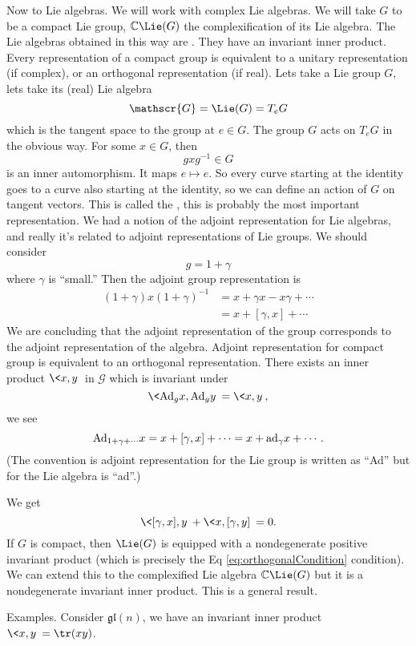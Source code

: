 Now to Lie algebras. We will work with complex Lie algebras. We
will take $G$ to be a compact Lie group, $\Bbb{C}\Lie(G)$ the
complexification of its Lie algebra. The Lie algebras obtained in
this way are %
. They have an invariant inner
product. Every representation of a compact group is equivalent to
a unitary representation (if complex), or an orthogonal
representation (if real). Lets take a Lie group $G$, lets take
its (real) Lie algebra 
\begin{equation}
\mathscr{G}=\Lie(G)=T_{e}G
\end{equation}
which is the tangent space to the group at $e\in G$. The group
$G$ acts on $T_{e}G$ in the obvious way. For some $x\in G$, then
\begin{equation}
gxg^{-1}\in G
\end{equation}
is an inner automorphism. It maps $e\mapsto e$. So every curve
starting at the identity goes to a curve also starting at the
identity, so we can define an action of $G$ on tangent
vectors. This is called the ,
this is probably the most important representation. We had a
notion of the adjoint representation for Lie algebras, and really
it's related to adjoint representations of Lie groups. We should
consider
\begin{equation}
g=1+\gamma
\end{equation}
where $\gamma$ is ``small.'' Then the adjoint group
representation is
\begin{subequations}
\begin{align}
(1+\gamma)x(1+\gamma)^{-1}&=x+\gamma x-x\gamma+\cdots \\
&= x + [\gamma,x] + \cdots
\end{align}
\end{subequations}
We are concluding that the adjoint representation of the group
corresponds to the adjoint representation of the algebra. Adjoint
representation for compact group is equivalent to an orthogonal
representation. There exists an inner product $\<x,y\>$ in
$\mathscr{G}$ which is invariant under
\begin{equation}
\<{\rm Ad}_{g}x,{\rm Ad}_{g}y\> = \<x,y\>,
\end{equation}
we see
\begin{equation}
{\rm Ad}_{1+\gamma+\cdots}x = x + [\gamma,x] + \cdots = x + {\rm
  ad}_{\gamma}x + \cdots.
\end{equation}
(The convention is adjoint representation for the Lie group is
written as ``Ad'' but for the Lie algebra is ``ad''.)

We get
\begin{equation}\label{eq:orthogonalCondition}
\<[\gamma,x],y\>+\<x,[\gamma,y]\>=0.
\end{equation}
If $G$ is compact, then $\Lie(G)$ is equipped with a
nondegenerate positive invariant product (which is precisely 
the Eq \eqref{eq:orthogonalCondition} condition). We can extend
this to the complexified Lie algebra $\Bbb{C}\Lie(G)$ but it is a
nondegenerate invariant inner product. This is a general result.

Examples. Consider $\mathfrak{gl}(n)$, we have an invariant inner
product $\<x,y\>=\tr(xy)$.

